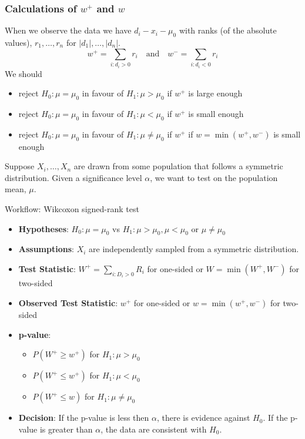 \documentclass[a4paper]{article}\usepackage[]{graphicx}\usepackage[]{xcolor}
\begin{document}
\subsubsection{Calculations of \( w^+ \) and \( w \)}
When we observe the data we have \( d_i - x_i - \mu_0 \) with ranks (of the absolute values), \( r_1,\dotsc,r_n \) for \( \lvert d_1 \rvert, \dotsc, \lvert d_n \rvert \).
\[
	w^+ = \sum_{i: d_i > 0} r_i \quad\text{and}\quad w^- = \sum_{i: d_i < 0} r_i
\]
We should
\begin{itemize}
	\item reject \( H_0: \mu = \mu_0 \) in favour of \( H_1: \mu > \mu_0 \) if \( w^+ \) is large enough
	\item reject \( H_0: \mu = \mu_0 \) in favour of \( H_1: \mu < \mu_0 \) if \( w^+ \) is small enough
	\item reject \( H_0: \mu = \mu_0 \) in favour of \( H_1: \mu \neq \mu_0 \) if \( w^+ \) if \( w = \min(w^+,w^-) \) is small enough
\end{itemize}
Suppose \( X_i,\dotsc,X_n \) are drawn from some population that follows a symmetric distribution. Given a significance level \( \alpha \), we want to test on the population mean, \( \mu \).
\begin{redbox}{Workflow: Wikcoxon signed-rank test}
	\begin{itemize}
		\item \textbf{Hypotheses}: \( H_0: \mu = \mu_0 \) vs \( H_1: \mu > \mu_0, \mu < \mu_0 \) or \( \mu \neq \mu_0 \)
		\item \textbf{Assumptions}: \( X_i \) are independently sampled from a symmetric distribution.
		\item \textbf{Test Statistic}: \( W^+ = \sum_{i: D_i > 0} R_i \) for one-sided or \( W = \min(W^+,W^-) \) for two-sided
		\item \textbf{Observed Test Statistic}: \( w^+ \) for one-sided or \( w = \min(w^+,w^-) \) for two-sided
		\item \textbf{p-value}:
		\begin{itemize}
			\item \( P(W^+ \geq w^+) \) for \( H_1: \mu > \mu_0 \)
			\item \( P(W^+ \leq w^+) \) for \( H_1: \mu < \mu_0 \) 
			\item \( P(W^+ \leq w) \) for \( H_1: \mu \neq \mu_0 \) 
		\end{itemize}
		\item \textbf{Decision}: If the p-value is less then \( \alpha \), there is evidence against \( H_0 \). If the p-value is greater than \( \alpha \), the data are consistent with \( H_0 \).
	\end{itemize}
\end{redbox}
\end{document}

